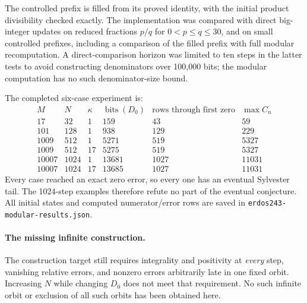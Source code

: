 \documentclass[11pt]{article}
\begin{document}
The controlled prefix is filled from its proved identity, with the initial
product divisibility checked exactly. The implementation was compared with
direct big-integer updates on reduced fractions $p/q$ for $0<p\le q\le30$,
and on small controlled prefixes, including a comparison of the filled
prefix with full modular recomputation. A direct-comparison horizon was
limited to ten steps in the latter tests to avoid constructing denominators
over 100,000 bits; the modular computation has no such denominator-size bound.

The completed six-case experiment is:
\[
\begin{array}{r|r|r|r|r|r}
 M&N&\kappa&\operatorname{bits}(D_0)&\text{rows through first zero}&\max C_n\\\hline
 17&32&1&159&43&59\\
 101&128&1&938&129&229\\
 1009&512&1&5271&519&5327\\
 1009&512&17&5275&519&5327\\
 10007&1024&1&13681&1027&11031\\
 10007&1024&17&13685&1027&11031
\end{array}
\]
Every case reached an exact zero error, so every one has an eventual
Sylvester tail. The 1024-step examples therefore refute no part of the
eventual conjecture. All initial states and computed numerator/error rows
are saved in \texttt{erdos243-modular-results.json}.

\paragraph{The missing infinite construction.}
The construction target still requires integrality and positivity at
\emph{every} step, vanishing relative errors, and nonzero errors arbitrarily
late in one fixed orbit. Increasing $N$ while changing $D_0$ does not meet
that requirement. No such infinite orbit or exclusion of all such orbits
has been obtained here.
\end{document}
